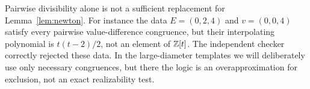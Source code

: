 

Pairwise divisibility alone is not a sufficient replacement for
Lemma~\ref{lem:newton}. For instance the data
$E=(0,2,4)$ and $v=(0,0,4)$ satisfy every pairwise value-difference
congruence, but their interpolating polynomial is
$t(t-2)/2$, not an element of $\mathbb Z[t]$. The independent checker
correctly rejected these data. In the large-diameter templates we
will deliberately use only necessary congruences, but there the
logic is an overapproximation for exclusion, not an exact
realizability test.
